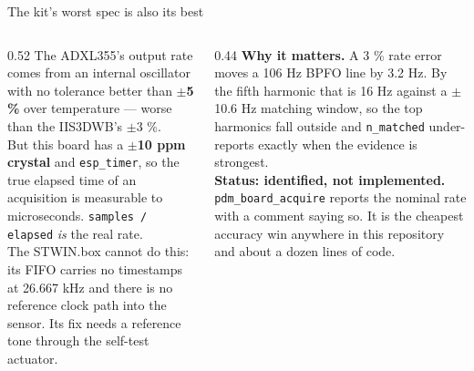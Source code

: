 \documentclass[aspectratio=169,10pt]{beamer}
\begin{document}
\begin{frame}{The kit's worst spec is also its best}
  \begin{columns}[T]
    \begin{column}{0.52\textwidth}
      \small
      The ADXL355's output rate comes from an internal oscillator with no
      tolerance better than \textbf{$\pm$5 \%} over temperature --- worse than
      the IIS3DWB's $\pm$3 \%.
      \\[2mm]
      \scriptsize
      But this board has a \textbf{$\pm$10 ppm crystal} and
      \texttt{esp\_timer}, so the true elapsed time of an acquisition is
      measurable to microseconds. \texttt{samples / elapsed} \emph{is} the real
      rate.
      \\[2mm]
      The STWIN.box cannot do this: its FIFO carries no timestamps at
      26.667 kHz and there is no reference clock path into the sensor. Its fix
      needs a reference tone through the self-test actuator.
    \end{column}
    \begin{column}{0.44\textwidth}
      \scriptsize
      \textbf{Why it matters.} A 3 \% rate error moves a 106 Hz BPFO line by
      3.2 Hz. By the fifth harmonic that is 16 Hz against a $\pm$10.6 Hz
      matching window, so the top harmonics fall outside and
      \texttt{n\_matched} under-reports exactly when the evidence is strongest.
      \\[2.5mm]
      \textbf{Status: identified, not implemented.}
      \texttt{pdm\_board\_acquire} reports the nominal rate with a comment
      saying so. It is the cheapest accuracy win anywhere in this repository and
      about a dozen lines of code.
    \end{column}
  \end{columns}
\end{frame}
\end{document}
